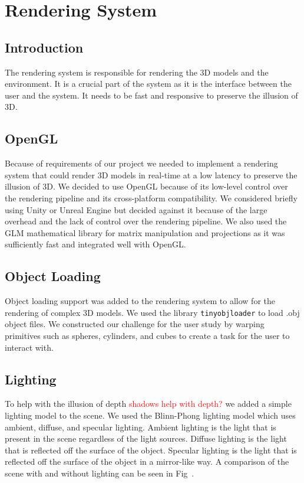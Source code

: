 \section{Rendering System}
\subsection{Introduction}
The rendering system is responsible for rendering the 3D models and the environment. It is a crucial part of the system as it is the interface between the user and the system. It needs to be fast and responsive to preserve the illusion of 3D.


\subsection{OpenGL}

Because of requirements of our project we needed to implement a rendering system that could render 3D models in real-time at a low latency to preserve the illusion of 3D. We decided to use OpenGL \tocite because of its low-level control over the rendering pipeline and its cross-platform compatibility. We considered briefly using Unity or Unreal Engine but decided against it because of the large overhead and the lack of control over the rendering pipeline. We also used the GLM \tocite mathematical library for matrix manipulation and projections as it was sufficiently fast and integrated well with OpenGL.

\subsection{Object Loading}

Object loading support was added to the rendering system to allow for the rendering of complex 3D models. We used the library \texttt{tinyobjloader} \tocite to load .obj object files. We constructed our challenge for the user study by warping primitives such as spheres, cylinders, and cubes to create a task for the user to interact with.

\subsection{Lighting}

To help with the illusion of depth \tocite \textcolor{red}{shadows help with depth?} we added a simple lighting model to the scene. We used the Blinn-Phong lighting model which uses ambient, diffuse, and specular lighting. Ambient lighting is the light that is present in the scene regardless of the light sources. Diffuse lighting is the light that is reflected off the surface of the object. Specular lighting is the light that is reflected off the surface of the object in a mirror-like way. A comparison of the scene with and without lighting can be seen in Fig~\todo.

